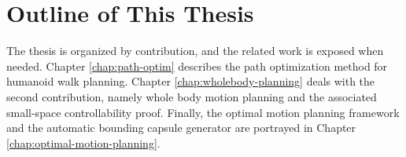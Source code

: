 \section{Outline of This Thesis}

The thesis is organized by contribution, and the related work is
exposed when needed. Chapter \ref{chap:path-optim} describes the path
optimization method for humanoid walk planning. Chapter
\ref{chap:wholebody-planning} deals with the second contribution,
namely whole body motion planning and the associated small-space
controllability proof. Finally, the optimal motion planning framework
and the automatic bounding capsule generator are portrayed in Chapter
\ref{chap:optimal-motion-planning}.
